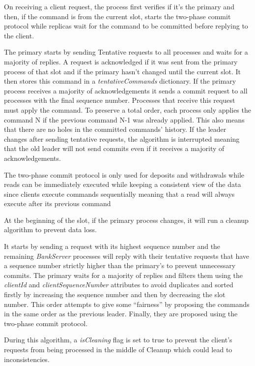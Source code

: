 \documentclass[times, 10pt,twocolumn]{article}
\begin{document}
On receiving a client request, the process first verifies if it's the primary and then, if the command is from the current slot, starts the two-phase commit protocol while replicas wait for the command to be committed before replying to the client.

The primary starts by sending Tentative requests to all processes and waits for a majority of replies. A request is acknowledged if it was sent from the primary process of that slot and if the primary hasn’t changed until the current slot. It then stores this command in a \textit{tentativeCommands} dictionary. If the primary process receives a majority of acknowledgements it sends a commit request to all processes with the final sequence number. Processes that receive this request must apply the command. To preserve a total order, each process only applies the command N if the previous command N-1 was already applied. This also means that there are no holes in the committed commands' history.
If the leader changes after sending tentative requests, the algorithm is interrupted meaning that the old leader will not send commits even if it receives a majority of acknowledgements.

The two-phase commit protocol is only used for deposits and withdrawals while reads can be immediately executed while keeping a consistent view of the data since clients execute commands sequentially meaning that a read will always execute after its previous command

At the beginning of the slot, if the primary process changes, it will run a cleanup algorithm to prevent data loss.

It starts by sending a request with its highest sequence number and the remaining \textit{BankServer} processes will reply with their tentative requests that have a sequence number strictly higher than the primary's to prevent unnecessary commits. 
The primary waits for a majority of replies and filters them using the \textit{clientId} and \textit{clientSequenceNumber} attributes to avoid duplicates and sorted firstly by increasing the sequence number and then by decreasing the slot number.
This order attempts to give some “fairness” by proposing the commands in the same order as the previous leader.
Finally, they are proposed using the two-phase commit protocol.

During this algorithm, a \textit{isCleaning} flag is set to true to prevent the client’s requests from being processed in the middle of Cleanup which could lead to inconsistencies.
\end{document}
